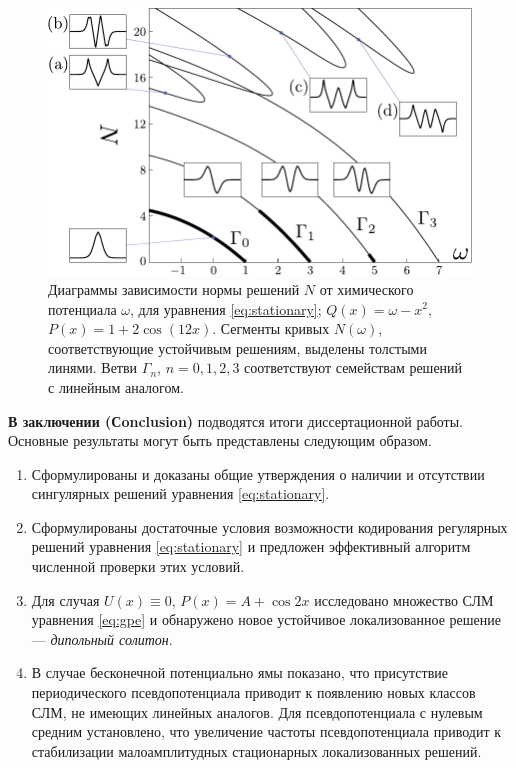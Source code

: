 \documentclass[candidate, href, colorlinks]{disser}
\begin{document}
\begin{figure}[h]
\centering
	\includegraphics[scale = 1]{pic/branches}
	\caption{
		Диаграммы зависимости нормы решений $N$ от химического потенциала $\omega$, для уравнения \eqref{eq:stationary}; $Q(x) = \omega - x^2$, $P(x) = 1 + 2 \cos (12 x)$.
		Сегменты кривых $N(\omega)$, соответствующие устойчивым решениям, выделены толстыми линями.
		Ветви $\Gamma_n$, $n = 0, 1, 2, 3$ соответствуют семействам решений с линейным аналогом.
	}
\label{fig:branches}
\end{figure}


\textbf{В заключении (Сonclusion)} подводятся итоги диссертационной работы.
Основные результаты могут быть представлены следующим образом.
\begin{enumerate}
	\item Сформулированы и доказаны общие утверждения о наличии и отсутствии сингулярных решений уравнения \eqref{eq:stationary}.
	\item Сформулированы достаточные условия возможности кодирования регулярных решений уравнения \eqref{eq:stationary} и предложен эффективный алгоритм численной проверки этих условий.
	\item Для случая $U(x) \equiv 0$, $P(x) = A + \cos 2x$ исследовано множество СЛМ уравнения \eqref{eq:gpe} и обнаружено новое устойчивое локализованное решение --- {\it дипольный солитон}.
	\item В случае бесконечной потенциально ямы показано, что присутствие периодического псевдопотенциала приводит к появлению новых классов СЛМ, не имеющих линейных аналогов.
		Для псевдопотенциала с нулевым средним установлено, что увеличение частоты псевдопотенциала приводит к стабилизации малоамплитудных стационарных локализованных решений.
\end{enumerate}
\end{document}
